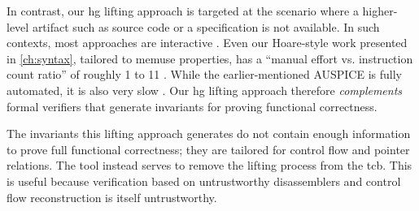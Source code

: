 In contrast, our \ac{hg} lifting approach is targeted at the scenario where a higher-level artifact such as source code or a specification is not available.
In such contexts, most approaches are interactive \autocite{goel2014syscalls,goelphd,verbeek2019refinement}.
Even our Hoare-style work presented in \cref{ch:syntax}, tailored to \gls{memuse} properties, has a ``manual effort vs. instruction count ratio'' of roughly 1 to 11 \autocite{verbeek2020automated}.
While the earlier-mentioned AUSPICE is fully automated, it is also very slow \textcite{tan2015auspice}.
Our \ac{hg} lifting approach therefore \emph{complements} formal verifiers that generate invariants for proving functional correctness.
\begin{remark}
  The invariants this lifting approach generates do not contain enough information to prove full functional correctness; they are tailored for control flow and pointer relations.
  The tool instead serves to remove the lifting process from the \ac{tcb}.
  This is useful because verification based on untrustworthy disassemblers and control flow reconstruction is itself untrustworthy.
\end{remark}

